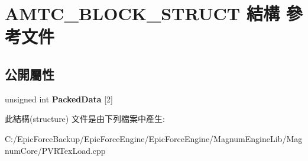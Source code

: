 \hypertarget{struct_a_m_t_c___b_l_o_c_k___s_t_r_u_c_t}{}\section{A\+M\+T\+C\+\_\+\+B\+L\+O\+C\+K\+\_\+\+S\+T\+R\+U\+CT 結構 參考文件}
\label{struct_a_m_t_c___b_l_o_c_k___s_t_r_u_c_t}
\subsection*{公開屬性}
\begin{DoxyCompactItemize}
\item 
unsigned int {\bfseries Packed\+Data} \mbox{[}2\mbox{]}\hypertarget{struct_a_m_t_c___b_l_o_c_k___s_t_r_u_c_t_a92abb2ddcfd8e4706c6c240beb5bffa5}{}\label{struct_a_m_t_c___b_l_o_c_k___s_t_r_u_c_t_a92abb2ddcfd8e4706c6c240beb5bffa5}

\end{DoxyCompactItemize}


此結構(structure) 文件是由下列檔案中產生\+:\begin{DoxyCompactItemize}
\item 
C\+:/\+Epic\+Force\+Backup/\+Epic\+Force\+Engine/\+Epic\+Force\+Engine/\+Magnum\+Engine\+Lib/\+Magnum\+Core/P\+V\+R\+Tex\+Load.\+cpp\end{DoxyCompactItemize}
